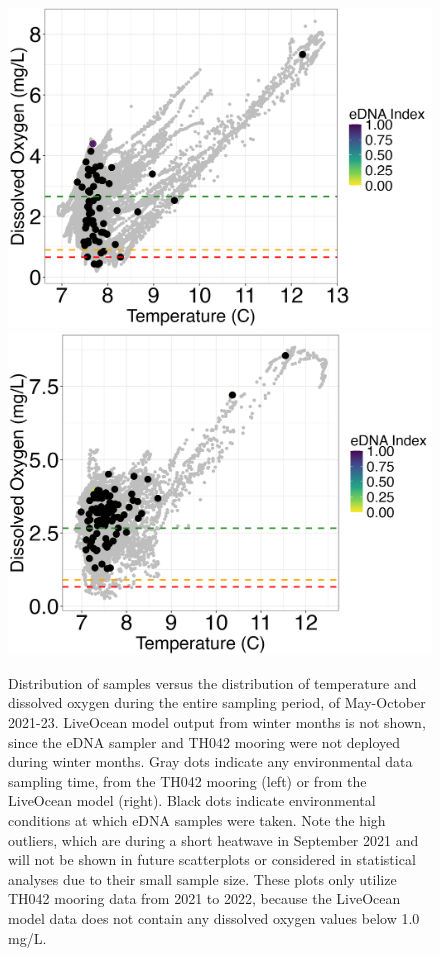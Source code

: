 \documentclass[12pt,twoside]{reedthesis}
\begin{document}
{	\begin{figure}[!h]
		\begin{center}
			\includegraphics[scale=0.35]{Scatter_ex}
			\includegraphics[scale=0.35]{Scatter_ex_Mod}
			\caption[Mooring vs. Model Scatterplot]{Distribution of samples versus the distribution of temperature and dissolved oxygen during the entire sampling period, of May-October 2021-23. LiveOcean model output from winter months is not shown, since the eDNA sampler and TH042 mooring were not deployed during winter months. Gray dots indicate any environmental data sampling time, from the TH042 mooring (left) or from the LiveOcean model (right). Black dots indicate environmental conditions at which eDNA samples were taken. Note the high outliers, which are during a short heatwave in September 2021 and will not be shown in future scatterplots or considered in statistical analyses due to their small sample size. These plots only utilize TH042 mooring data from 2021 to 2022, because the LiveOcean model data does not contain any dissolved oxygen values below 1.0 mg/L.} %
		\end{center}
		\label{EnvironmentalConditions}
	\end{figure} 
	
}
\end{document}
